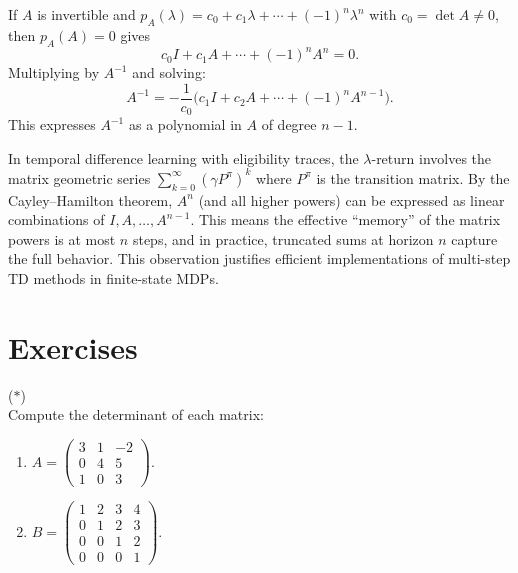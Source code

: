 \documentclass[11pt,a4paper]{article}
\begin{document}
\begin{example}
\label{ex:ch_inverse}
If $A$ is invertible and $p_A(\lambda) = c_0 + c_1\lambda + \cdots + (-1)^n\lambda^n$
with $c_0 = \det A \neq 0$, then $p_A(A) = 0$ gives
\[
  c_0 I + c_1 A + \cdots + (-1)^n A^n = 0.
\]
Multiplying by $A^{-1}$ and solving:
\[
  A^{-1} = -\frac{1}{c_0}\bigl(c_1 I + c_2 A + \cdots + (-1)^n A^{n-1}\bigr).
\]
This expresses $A^{-1}$ as a polynomial in $A$ of degree $n-1$.
\end{example}

\begin{rlconnection}[title={Cayley--Hamilton in Multi-Step TD}]
In temporal difference learning with eligibility traces, the
$\lambda$-return involves the matrix geometric series
$\sum_{k=0}^{\infty} (\gamma P^\pi)^k$ where $P^\pi$ is the transition
matrix.  By the Cayley--Hamilton theorem, $A^n$ (and all higher powers)
can be expressed as linear combinations of $I, A, \ldots, A^{n-1}$.
This means the effective ``memory'' of the matrix powers is at most $n$
steps, and in practice, truncated sums at horizon $n$ capture the full
behavior.  This observation justifies efficient implementations of
multi-step TD methods in finite-state MDPs.
\end{rlconnection}

\section{Exercises}
\label{sec:exercises}

\begin{exercise}
\label{exer:det_computation}
\textnormal{(\(*\))} \\
Compute the determinant of each matrix:
\begin{enumerate}[nosep,label=(\alph*)]
  \item $A = \begin{pmatrix} 3 & 1 & -2 \\ 0 & 4 & 5 \\ 1 & 0 & 3 \end{pmatrix}$.
  \item $B = \begin{pmatrix} 1 & 2 & 3 & 4 \\ 0 & 1 & 2 & 3 \\
        0 & 0 & 1 & 2 \\ 0 & 0 & 0 & 1 \end{pmatrix}$.
\end{enumerate}
\end{exercise}
\end{document}
